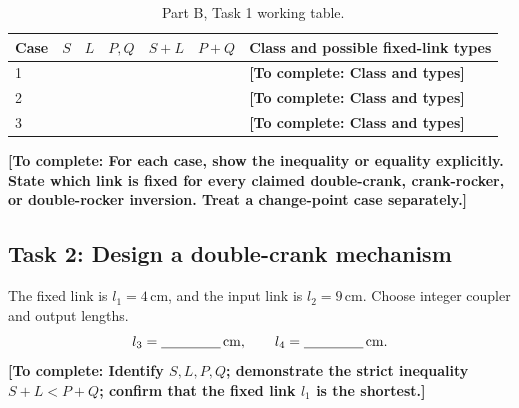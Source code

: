 \documentclass[11pt,a4paper]{article}
\newcommand{\prompt}[1]{\textcolor{blue!60!black}{\textbf{[To complete: #1]}}}
\newcommand{\blank}{\underline{\hspace{1.5cm}}}
\newcommand{\shortblank}{\underline{\hspace{0.8cm}}}
\begin{document}
\begin{table}[htbp]
  \centering
  \caption{Part B, Task 1 working table.}
  \begin{tabularx}{\linewidth}{@{}lcccccX@{}}
    \toprule
    Case & $S$ & $L$ & $P,Q$ & $S+L$ & $P+Q$ & Class and possible fixed-link types\\
    \midrule
    1 & \shortblank & \shortblank & \shortblank & \shortblank & \shortblank & \prompt{Class and types}\\
    2 & \shortblank & \shortblank & \shortblank & \shortblank & \shortblank & \prompt{Class and types}\\
    3 & \shortblank & \shortblank & \shortblank & \shortblank & \shortblank & \prompt{Class and types}\\
    \bottomrule
  \end{tabularx}
\end{table}

\prompt{For each case, show the inequality or equality explicitly. State
which link is fixed for every claimed double-crank, crank-rocker, or
double-rocker inversion. Treat a change-point case separately.}

\subsection{Task 2: Design a double-crank mechanism}
The fixed link is $l_1=4\,\mathrm{cm}$, and the input link is
$l_2=9\,\mathrm{cm}$. Choose integer coupler and output lengths.
\begin{equation*}
  l_3=\blank\,\mathrm{cm},\qquad l_4=\blank\,\mathrm{cm}.
\end{equation*}
\prompt{Identify $S,L,P,Q$; demonstrate the strict inequality
$S+L<P+Q$; confirm that the fixed link $l_1$ is the shortest.}
\end{document}
